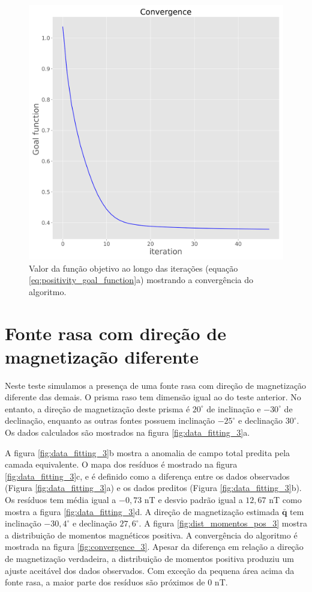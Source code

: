 \begin{figure}
	\centering
	\includegraphics[width=.9\textwidth]{Fig/eqlayer/unidir_shallow_test/convergence_LM_NNLS_magRM.png}
	\caption{Valor da função objetivo ao longo das iterações (equação \ref{eq:positivity_goal_function}a) mostrando a convergência do algoritmo.}
	\label{fig:convergence_2}
\end{figure}

\section{Fonte rasa com direção de magnetização diferente}

Neste teste simulamos a presença de uma fonte rasa com direção de magnetização diferente das demais. O prisma raso tem dimensão igual ao do teste anterior. No entanto, a direção de magnetização deste prisma é $20^\circ$ de inclinação e $-30^\circ$ de declinação, enquanto as outras fontes possuem inclinação $-25^\circ$ e declinação $30^\circ$. Os dados calculados são mostrados na figura \ref{fig:data_fitting_3}a. 

A figura \ref{fig:data_fitting_3}b mostra a anomalia de campo total predita pela camada equivalente. O mapa dos resíduos é mostrado na figura \ref{fig:data_fitting_3}c, e é definido como a diferença entre os dados observados (Figura \ref{fig:data_fitting_3}a) e os dados preditos (Figura \ref{fig:data_fitting_3}b). Os resíduos tem média igual a $-0,73$ nT e desvio padrão igual a  $12,67$ nT como mostra a figura \ref{fig:data_fitting_3}d. A direção de magnetização estimada $\bar{\mathbf{q}}$ tem inclinação $-30,4^\circ$ e declinação $27,6^\circ$. A figura \ref{fig:dist_momentos_pos_3} mostra a distribuição de momentos magnéticos positiva. A convergência do algoritmo é mostrada na figura \ref{fig:convergence_3}. Apesar da diferença em relação a direção de magnetização verdadeira, a distribuição de momentos positiva produziu um ajuste aceitável dos dados observados. Com exceção da pequena área acima da fonte rasa, a maior parte dos resíduos são próximos de $0$ nT. 

